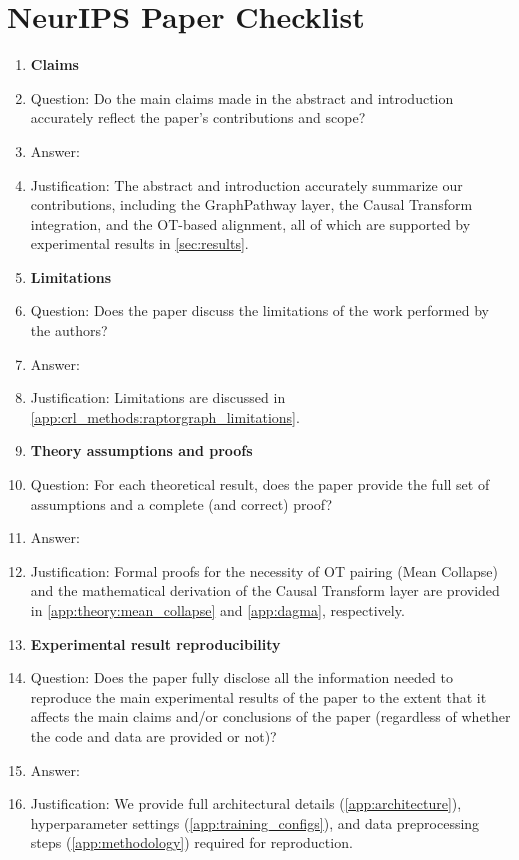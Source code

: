 \section*{NeurIPS Paper Checklist}

\begin{enumerate}

\item {\bf Claims}
    \item[] Question: Do the main claims made in the abstract and introduction accurately reflect the paper's contributions and scope?
    \item[] Answer: \answerYes{}
    \item[] Justification: The abstract and introduction accurately summarize our contributions, including the GraphPathway layer, the Causal Transform integration, and the OT-based alignment, all of which are supported by experimental results in \cref{sec:results}.

\item {\bf Limitations}
    \item[] Question: Does the paper discuss the limitations of the work performed by the authors?
    \item[] Answer: \answerYes{}
    \item[] Justification: Limitations are discussed in \cref{app:crl_methods:raptorgraph_limitations}.

\item {\bf Theory assumptions and proofs}
    \item[] Question: For each theoretical result, does the paper provide the full set of assumptions and a complete (and correct) proof?
    \item[] Answer: \answerYes{}
    \item[] Justification: Formal proofs for the necessity of OT pairing (Mean Collapse) and the mathematical derivation of the Causal Transform layer are provided in \cref{app:theory:mean_collapse} and \cref{app:dagma}, respectively.

\item {\bf Experimental result reproducibility}
    \item[] Question: Does the paper fully disclose all the information needed to reproduce the main experimental results of the paper to the extent that it affects the main claims and/or conclusions of the paper (regardless of whether the code and data are provided or not)?
    \item[] Answer: \answerYes{}
    \item[] Justification: We provide full architectural details (\cref{app:architecture}), hyperparameter settings (\cref{app:training_configs}), and data preprocessing steps (\cref{app:methodology}) required for reproduction.


\end{enumerate}
